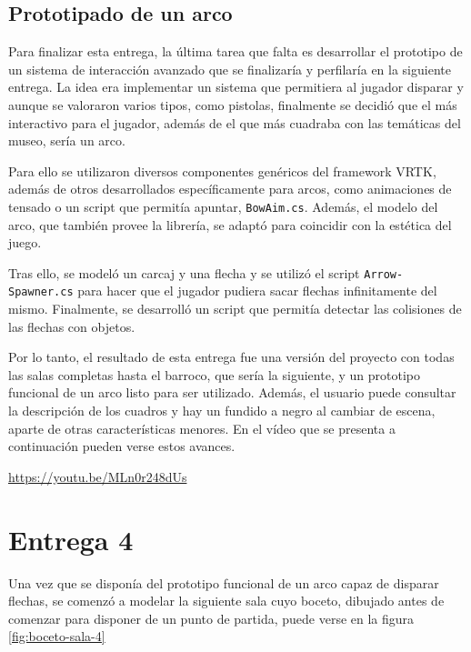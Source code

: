 \subsection{Prototipado de un arco}

Para finalizar esta entrega, la última tarea que falta es desarrollar el prototipo de un sistema de interacción avanzado que se finalizaría y perfilaría en la siguiente entrega. La idea era implementar un sistema que permitiera al jugador disparar y aunque se valoraron varios tipos, como pistolas, finalmente se decidió que el más interactivo para el jugador, además de el que más cuadraba con las temáticas del museo, sería un arco.

Para ello se utilizaron diversos componentes genéricos del framework \acs{VRTK}, además de otros desarrollados específicamente para arcos, como animaciones de tensado o un script que permitía apuntar, \texttt{BowAim.cs}. Además, el modelo del arco, que también provee la librería, se adaptó para coincidir con la estética del juego.

Tras ello, se modeló un carcaj y una flecha y se utilizó el script \texttt{Arrow-} \texttt{Spawner.cs} para hacer que el jugador pudiera sacar flechas infinitamente del mismo. Finalmente, se desarrolló un script que permitía detectar las colisiones de las flechas con objetos.

Por lo tanto, el resultado de esta entrega fue una versión del proyecto con todas las salas completas hasta el barroco, que sería la siguiente, y un prototipo funcional de un arco listo para ser utilizado. Además, el usuario puede consultar la descripción de los cuadros y hay un fundido a negro al cambiar de escena, aparte de otras características menores. En el vídeo que se presenta a continuación pueden verse estos avances.

\begin{center}
    \url{https://youtu.be/MLn0r248dUs}
\end{center}



\section{Entrega 4}

Una vez que se disponía del prototipo funcional de un arco capaz de disparar flechas, se comenzó a modelar la siguiente sala cuyo boceto, dibujado antes de comenzar para disponer de un punto de partida, puede verse en la figura \ref{fig:boceto-sala-4}

